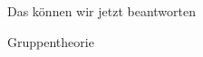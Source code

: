 \begin{frame}[fragile]{Das können wir jetzt beantworten}
	\begin{alertblock}{Gruppentheorie}
		\begin{itemize}
		\end{itemize}
	\end{alertblock}
\end{frame}